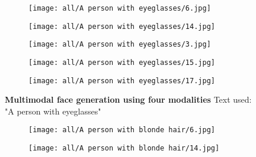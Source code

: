 \documentclass[10pt,twocolumn,letterpaper]{article}
\begin{document}
\begin{figure*}[t!]
    \centering
    \begin{subfigure}[t]{\linewidth}
      \captionsetup{justification=centering, labelformat=empty, font=scriptsize}
\texttt{[image: all/A person with eyeglasses/6.jpg]}

    \end{subfigure}
       \begin{subfigure}[t]{\linewidth}
      \captionsetup{justification=centering, labelformat=empty, font=scriptsize}
  \texttt{[image: all/A person with eyeglasses/14.jpg]}

    \end{subfigure}
      \begin{subfigure}[t]{\linewidth}
      \captionsetup{justification=centering, labelformat=empty, font=scriptsize}
  \texttt{[image: all/A person with eyeglasses/3.jpg]}

    \end{subfigure}
     \begin{subfigure}[t]{\linewidth}
      \captionsetup{justification=centering, labelformat=empty, font=scriptsize}
  \texttt{[image: all/A person with eyeglasses/15.jpg]}

    \end{subfigure}
\begin{subfigure}[t]{\linewidth}
      \captionsetup{justification=centering, labelformat=empty, font=scriptsize}
  \texttt{[image: all/A person with eyeglasses/17.jpg]}

    \end{subfigure}

    \vspace{-3mm}    \caption{\textbf{Multimodal face generation using four modalities} Text used: "A person with eyeglasses" }
    \label{fig:facesematicsupp1}
  \end{figure*} \begin{figure*}[t!]
    \centering
    \begin{subfigure}[t]{\linewidth}
      \captionsetup{justification=centering, labelformat=empty, font=scriptsize}
\texttt{[image: all/A person with blonde hair/6.jpg]}

    \end{subfigure}
       \begin{subfigure}[t]{\linewidth}
      \captionsetup{justification=centering, labelformat=empty, font=scriptsize}
  \texttt{[image: all/A person with blonde hair/14.jpg]}


\end{subfigure}
\end{figure*}
\end{document}
